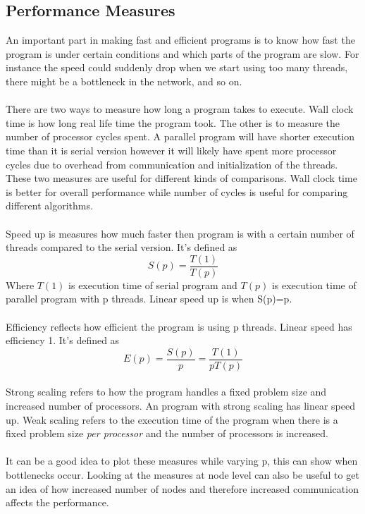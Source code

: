\documentclass[10pt,a4paper]{report}
\begin{document}
\clearpage
\subsection{Performance Measures}
An important part in making fast and efficient programs is to know how fast the program is under certain conditions and which parts of the program are slow. For instance the speed could suddenly drop when we start using too many threads, there might be a bottleneck in the network, and so on.\\
\\
There are two ways to measure how long a program takes to execute. Wall clock time is how long real life time the program took. The other is to measure the number of processor cycles spent. A parallel program will have shorter execution time than it is serial version however it will likely have spent more processor cycles due to overhead from communication and initialization of the threads. These two measures are useful for different kinds of comparisons. Wall clock time is better for overall performance while number of cycles is useful for comparing different algorithms.\\
\\
Speed up is measures how much faster then program is with a certain number of threads compared to the serial version. It's defined as
$$S(p)=\frac{T(1)}{T(p)}$$
Where $T(1)$ is execution time of serial program and $T(p)$ is execution time of parallel program with p threads. Linear speed up is when S(p)=p.\\
\\
Efficiency reflects how efficient the program is using p threads. Linear speed has efficiency 1. It's defined as
$$E(p)=\frac{S(p)}{p}=\frac{T(1)}{pT(p)}$$
\\
Strong scaling refers to how the program handles a fixed problem size and increased number of processors. An program with strong scaling has linear speed up. Weak scaling refers to the execution time of the program when there is a fixed problem size \emph{per processor} and the number of processors is increased.\cite{cuda_best_practice}\\
\\
It can be a good idea to plot these measures while varying p, this can show when bottlenecks occur. Looking at the measures at node level can also be useful to get an idea of how increased number of nodes and therefore increased communication affects the performance.
\end{document}
